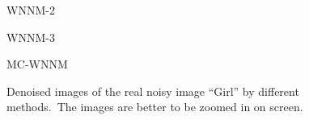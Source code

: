 \begin{figure}
{\begin{minipage}[t]{0.19\textwidth}
{\footnotesize WNNM-2 }
\end{minipage}
\begin{minipage}[t]{0.19\textwidth}
\centering
{}
{\footnotesize WNNM-3 }
\end{minipage}
\begin{minipage}[t]{0.19\textwidth}
\centering
{}
{\footnotesize MC-WNNM }
\end{minipage}
}
    \caption{Denoised images of the real noisy image ``Girl'' \cite{ncwebsite} by different methods.\ The images are better to be zoomed in on screen.}
    \label{fig4-10}
\end{figure}


